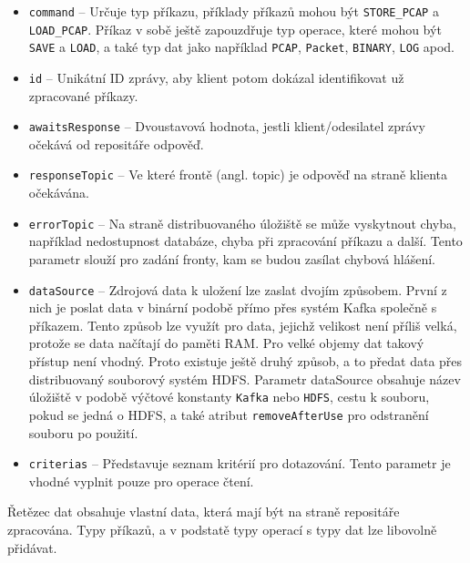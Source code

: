 \begin{itemize}
    \item \texttt{command} -- Určuje typ příkazu, příklady příkazů mohou být \texttt{STORE\_PCAP} a \texttt{LOAD\_PCAP}. Příkaz v sobě ještě zapouzdřuje typ operace, které mohou být \texttt{SAVE} a \texttt{LOAD}, a také typ dat jako například \texttt{PCAP}, \texttt{Packet}, \texttt{BINARY}, \texttt{LOG} apod.
    
    \item \texttt{id} -- Unikátní ID zprávy, aby klient potom dokázal identifikovat už zpracované příkazy.
    
    \item \texttt{awaitsResponse} -- Dvoustavová hodnota, jestli klient/odesilatel zprávy očekává od repositáře odpověď.
    
    \item \texttt{responseTopic} -- Ve které frontě (angl. topic) je odpověď na straně klienta očekávána.
    
    \item \texttt{errorTopic} -- Na straně distribuovaného úložiště se může vyskytnout chyba, například nedostupnost databáze, chyba při zpracování příkazu a další. Tento parametr slouží pro zadání fronty, kam se budou zasílat chybová hlášení.
    
    \item \texttt{dataSource} -- Zdrojová data k uložení lze zaslat dvojím způsobem. První z nich je poslat data v binární podobě přímo přes systém Kafka společně s příkazem. Tento způsob lze využít pro data, jejichž velikost není příliš velká, protože se data načítají do paměti RAM. Pro velké objemy dat takový přístup není vhodný. Proto existuje ještě druhý způsob, a to předat data přes distribuovaný souborový systém HDFS. Parametr dataSource obsahuje název úložiště v podobě výčtové konstanty \texttt{Kafka} nebo \texttt{HDFS}, cestu k souboru, pokud se jedná o HDFS, a také atribut \texttt{removeAfterUse} pro odstranění souboru po použití.
    
    \item \texttt{criterias} -- Představuje seznam kritérií pro dotazování. Tento parametr je vhodné vyplnit pouze pro operace čtení.
\end{itemize}

\noindent Řetězec dat obsahuje vlastní data, která mají být na straně repositáře zpracována. Typy příkazů, a v podstatě typy operací s typy dat lze libovolně přidávat.

